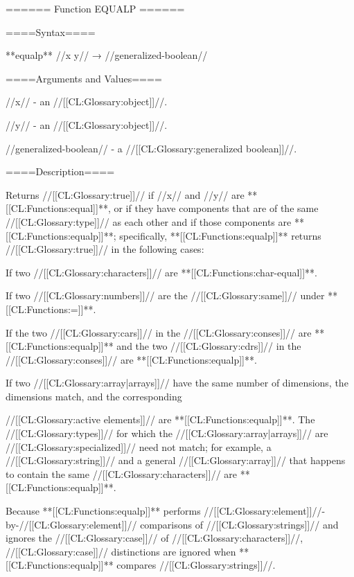 ====== Function EQUALP ======

====Syntax====

**equalp** //x y// → //generalized-boolean//

====Arguments and Values====

//x// - an //[[CL:Glossary:object]]//.

//y// - an //[[CL:Glossary:object]]//.

//generalized-boolean// - a //[[CL:Glossary:generalized boolean]]//.

====Description====

Returns //[[CL:Glossary:true]]// if //x// and //y// are **[[CL:Functions:equal]]**, or if they have components that are of the same //[[CL:Glossary:type]]// as each other and if those components are **[[CL:Functions:equalp]]**; specifically, **[[CL:Functions:equalp]]** returns //[[CL:Glossary:true]]// in the following cases: \beginlist {}

If two //[[CL:Glossary:characters]]// are **[[CL:Functions:char-equal]]**.


If two //[[CL:Glossary:numbers]]// are the //[[CL:Glossary:same]]// under **[[CL:Functions:=]]**.


If the two //[[CL:Glossary:cars]]// in the //[[CL:Glossary:conses]]// are **[[CL:Functions:equalp]]** and the two //[[CL:Glossary:cdrs]]// in the //[[CL:Glossary:conses]]// are **[[CL:Functions:equalp]]**.


If two //[[CL:Glossary:array|arrays]]// have the same number of dimensions, the dimensions match, and the corresponding

//[[CL:Glossary:active elements]]// are **[[CL:Functions:equalp]]**. The //[[CL:Glossary:types]]// for which the //[[CL:Glossary:array|arrays]]// are //[[CL:Glossary:specialized]]// need not match; for example, a //[[CL:Glossary:string]]// and a general //[[CL:Glossary:array]]// that happens to contain the same //[[CL:Glossary:characters]]// are **[[CL:Functions:equalp]]**.

Because **[[CL:Functions:equalp]]** performs //[[CL:Glossary:element]]//-by-//[[CL:Glossary:element]]// comparisons of //[[CL:Glossary:strings]]// and ignores the //[[CL:Glossary:case]]// of //[[CL:Glossary:characters]]//, //[[CL:Glossary:case]]// distinctions are ignored when **[[CL:Functions:equalp]]** compares //[[CL:Glossary:strings]]//.

